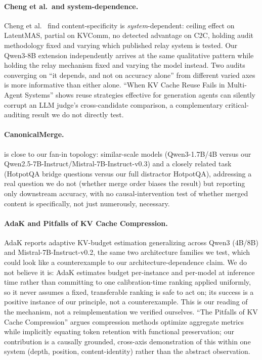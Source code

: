 \documentclass[11pt]{article}
\begin{document}
\paragraph{Cheng et al.\ and system-dependence.} Cheng et al.\
\citep{latentcommpay2026} find content-specificity is
\emph{system}-dependent: ceiling effect on LatentMAS, partial on
KVComm, no detected advantage on C2C, holding audit methodology fixed
and varying which published relay system is tested. Our Qwen3-8B
extension independently arrives at the same qualitative pattern while
holding the relay mechanism fixed and varying the model instead. Two
audits converging on ``it depends, and not on accuracy alone'' from
different varied axes is more informative than either alone. ``When KV
Cache Reuse Fails in Multi-Agent Systems'' \citep{kvreusefails2026}
shows reuse strategies effective for generation agents can silently
corrupt an LLM judge's cross-candidate comparison, a complementary
critical-auditing result we do not directly test.

\paragraph{CanonicalMerge.} \citep{canonicalmerge2026} is close to our
fan-in topology: similar-scale models (Qwen3-1.7B/4B versus our
Qwen2.5-7B-Instruct/Mistral-7B-Instruct-v0.3) and a closely related task
(HotpotQA bridge questions versus our full distractor HotpotQA),
addressing a real question we do not (whether merge order biases the
result) but reporting only downstream accuracy, with no
causal-intervention test of whether merged content is specifically, not
just numerously, necessary.

\paragraph{AdaK and Pitfalls of KV Cache Compression.} AdaK
\citep{adak2026} reports adaptive KV-budget estimation generalizing
across Qwen3 (4B/8B) and Mistral-7B-Instruct-v0.2, the same two
architecture families we test, which could look like a counterexample to
our architecture-dependence claim.
We do not believe it is: AdaK estimates budget per-instance and
per-model at inference time rather than committing to one
calibration-time ranking applied uniformly, so it never assumes a
fixed, transferable ranking is safe to act on; its success is a
positive instance of our principle, not a counterexample. This is our
reading of the mechanism, not a reimplementation we verified ourselves.
``The Pitfalls of KV Cache Compression'' \citep{pitfallskv2026} argues
compression methods optimize aggregate metrics while implicitly
equating token retention with functional preservation; our contribution
is a causally grounded, cross-axis demonstration of this within one
system (depth, position, content-identity) rather than the abstract
observation.
\end{document}
